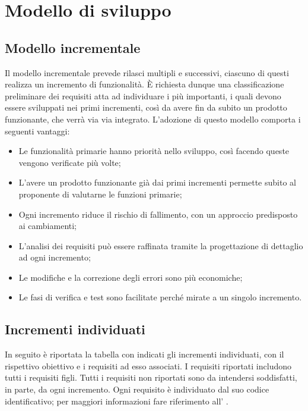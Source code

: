 \section{Modello di sviluppo}

\subsection{Modello incrementale}
Il modello incrementale prevede rilasci multipli e successivi, ciascuno di questi realizza un incremento di funzionalità.
È richiesta dunque una classificazione preliminare dei requisiti atta ad individuare i più importanti, i quali devono essere sviluppati nei primi incrementi, così da avere fin da subito un prodotto funzionante, che verrà via via integrato.
L'adozione di questo modello comporta i seguenti vantaggi:
\begin{itemize}
\item Le funzionalità primarie hanno priorità nello sviluppo, così facendo queste vengono verificate più volte;
\item L'avere un prodotto funzionante già dai primi incrementi permette subito al proponente di valutarne le funzioni primarie;
\item Ogni incremento riduce il rischio di fallimento, con un approccio predisposto ai cambiamenti;
\item L'analisi dei requisiti può essere raffinata tramite la progettazione di dettaglio ad ogni incremento;
\item Le modifiche e la correzione degli errori sono più economiche;
\item Le fasi di verifica e test sono facilitate perché mirate a un singolo incremento.
\end{itemize}

\subsection{Incrementi individuati}
In seguito è riportata la tabella con indicati gli incrementi individuati, con il rispettivo obiettivo e i requisiti ad esso associati. 
I requisiti riportati includono tutti i requisiti figli. Tutti i requisiti non riportati sono da intendersi soddisfatti, in parte, da ogni incremento.
Ogni requisito è individuato dal suo codice identificativo; per maggiori informazioni fare riferimento all' \AdRv{}.

